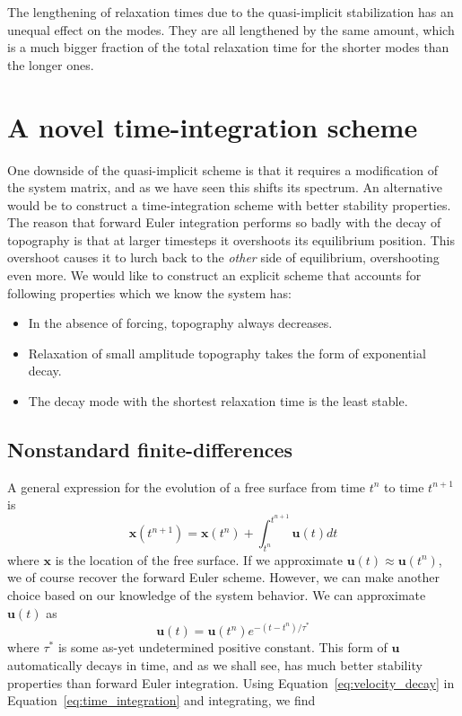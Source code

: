 \documentclass[preprint,12pt,authoryear]{elsarticle}
\begin{document}
The lengthening of relaxation times due to the quasi-implicit stabilization has an unequal 
effect on the modes. They are all lengthened by the same amount, which is a much bigger 
fraction of the total relaxation time for the shorter modes than the longer ones.

\section{A novel time-integration scheme}

One downside of the quasi-implicit scheme is that it requires a modification of the system matrix, 
and as we have seen this shifts its spectrum.
An alternative would be to construct a time-integration scheme with better stability properties.  
The reason that forward Euler integration performs so badly with the decay of topography is that 
at larger timesteps it overshoots its equilibrium position. This overshoot causes it to lurch back 
to the \emph{other} side of equilibrium, overshooting even more.
We would like to construct an explicit scheme that accounts for following properties which we know the system has:
\begin{itemize}
\item In the absence of forcing, topography always decreases.
\item Relaxation of small amplitude topography takes the form of exponential decay.
\item The decay mode with the shortest relaxation time is the least stable.
\end{itemize}

\subsection{Nonstandard finite-differences}

A general expression for the evolution of a free surface from time $t^n$ to time $t^{n+1}$ is 
\begin{equation}
\mathbf{x}(t^{n+1}) = \mathbf{x}(t^n) + \int_{t^{n}}^{t^{n+1}} \mathbf{u}(t) dt
\label{eq:time_integration}
\end{equation}
where $\mathbf{x}$ is the location of the free surface.  If we approximate $\mathbf{u}(t) \approx \mathbf{u}(t^{n})$, 
we of course recover the forward Euler scheme.
However, we can make another choice based on our knowledge of the system behavior. 
We can approximate $\mathbf{u}(t)$ as
\begin{equation}
\mathbf{u}(t) = \mathbf{u}(t^n) e^{-(t-t^n)/\tau^*}
\label{eq:velocity_decay}
\end{equation}
where $\tau^*$ is some as-yet undetermined positive constant.
This form of $\mathbf{u}$ automatically decays in time, and as we shall see, has much better 
stability properties than forward Euler integration.
Using Equation~\eqref{eq:velocity_decay} in Equation~\eqref{eq:time_integration} and integrating, we find
\end{document}
